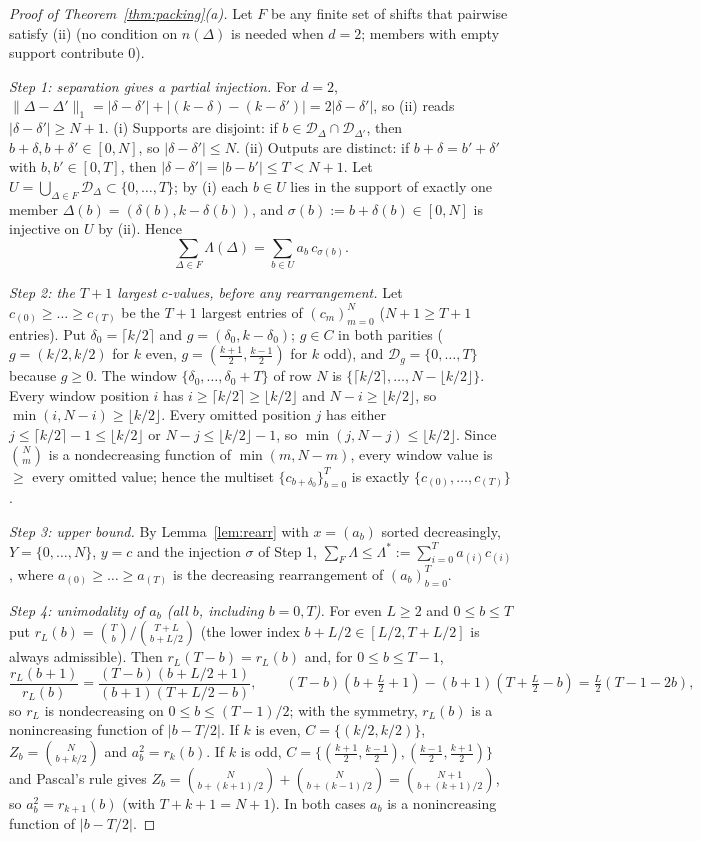 \documentclass[11pt]{article}
\theoremstyle{definition}
\theoremstyle{remark}
\begin{document}
\begin{proof}[Proof of Theorem~\ref{thm:packing}(a)]
Let $F$ be any finite set of shifts that pairwise satisfy (ii) (no condition on $n(\Delta)$ is needed when $d=2$; members with empty
support contribute $0$).

\emph{Step 1: separation gives a partial injection.} For $d=2$, $\lVert\Delta-\Delta'\rVert_1=|\delta-\delta'|+|(k-\delta)-(k-\delta')|=2|\delta-\delta'|$,
so (ii) reads $|\delta-\delta'|\ge N+1$. (i) Supports are disjoint: if $b\in\mathcal D_\Delta\cap\mathcal D_{\Delta'}$, then
$b+\delta,b+\delta'\in[0,N]$, so $|\delta-\delta'|\le N$. (ii) Outputs are distinct: if $b+\delta=b'+\delta'$ with $b,b'\in[0,T]$, then
$|\delta-\delta'|=|b-b'|\le T<N+1$. Let $U=\bigcup_{\Delta\in F}\mathcal D_\Delta\subset\{0,\dots,T\}$; by (i) each $b\in U$ lies in the support of
exactly one member $\Delta(b)=(\delta(b),k-\delta(b))$, and $\sigma(b):=b+\delta(b)\in[0,N]$ is injective on $U$ by (ii). Hence
\[
\sum_{\Delta\in F}\Lambda(\Delta)=\sum_{b\in U}a_b\,c_{\sigma(b)} .
\]

\emph{Step 2: the $T+1$ largest $c$-values, before any rearrangement.} Let $c_{(0)}\ge\dots\ge c_{(T)}$ be the $T+1$ largest entries of
$(c_m)_{m=0}^N$ ($N+1\ge T+1$ entries). Put $\delta_0=\lceil k/2\rceil$ and $g=(\delta_0,k-\delta_0)$; $g\in C$ in both parities ($g=(k/2,k/2)$ for $k$ even,
$g=(\frac{k+1}2,\frac{k-1}2)$ for $k$ odd), and $\mathcal D_g=\{0,\dots,T\}$ because $g\ge0$. The window $\{\delta_0,\dots,\delta_0+T\}$ of row $N$
is $\{\lceil k/2\rceil,\dots,N-\lfloor k/2\rfloor\}$. Every window position $i$ has $i\ge\lceil k/2\rceil\ge\lfloor k/2\rfloor$ and $N-i\ge\lfloor k/2\rfloor$,
so $\min(i,N-i)\ge\lfloor k/2\rfloor$. Every omitted position $j$ has either $j\le\lceil k/2\rceil-1\le\lfloor k/2\rfloor$ or $N-j\le\lfloor k/2\rfloor-1$, so
$\min(j,N-j)\le\lfloor k/2\rfloor$. Since $\binom Nm$ is a nondecreasing function of $\min(m,N-m)$, every window value is $\ge$ every omitted value;
hence the multiset $\{c_{b+\delta_0}\}_{b=0}^T$ is exactly $\{c_{(0)},\dots,c_{(T)}\}$.

\emph{Step 3: upper bound.} By Lemma~\ref{lem:rearr} with $x=(a_b)$ sorted decreasingly, $Y=\{0,\dots,N\}$, $y=c$ and the injection $\sigma$ of Step 1,
$\sum_F\Lambda\le\Lambda^\ast:=\sum_{i=0}^Ta_{(i)}c_{(i)}$, where $a_{(0)}\ge\dots\ge a_{(T)}$ is the decreasing rearrangement of $(a_b)_{b=0}^T$.

\emph{Step 4: unimodality of $a_b$ (all $b$, including $b=0,T$).} For even $L\ge2$ and $0\le b\le T$ put $r_L(b)=\binom Tb/\binom{T+L}{b+L/2}$
(the lower index $b+L/2\in[L/2,T+L/2]$ is always admissible). Then $r_L(T-b)=r_L(b)$ and, for $0\le b\le T-1$,
\[
\frac{r_L(b+1)}{r_L(b)}=\frac{(T-b)(b+L/2+1)}{(b+1)(T+L/2-b)},\qquad (T-b)(b+\tfrac L2+1)-(b+1)(T+\tfrac L2-b)=\tfrac L2(T-1-2b),
\]
so $r_L$ is nondecreasing on $0\le b\le(T-1)/2$; with the symmetry, $r_L(b)$ is a nonincreasing function of $|b-T/2|$. If $k$ is even,
$C=\{(k/2,k/2)\}$, $Z_b=\binom N{b+k/2}$ and $a_b^2=r_k(b)$. If $k$ is odd, $C=\{(\frac{k+1}2,\frac{k-1}2),(\frac{k-1}2,\frac{k+1}2)\}$ and Pascal's rule
gives $Z_b=\binom N{b+(k+1)/2}+\binom N{b+(k-1)/2}=\binom{N+1}{b+(k+1)/2}$, so $a_b^2=r_{k+1}(b)$ (with $T+k+1=N+1$). In both cases $a_b$ is a
nonincreasing function of $|b-T/2|$.


\end{proof}
\end{document}
